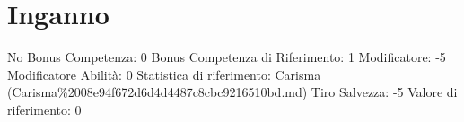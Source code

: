 \section{Inganno}\label{inganno}

\begin{description}
\tightlist
\item[Tags: ABI]
No Bonus Competenza: 0 Bonus Competenza di Riferimento: 1 Modificatore:
-5 Modificatore Abilità: 0 Statistica di riferimento: Carisma
(Carisma\%2008e94f672d6d4d4487c8cbc9216510bd.md) Tiro Salvezza: -5
Valore di riferimento: 0
\end{description}
